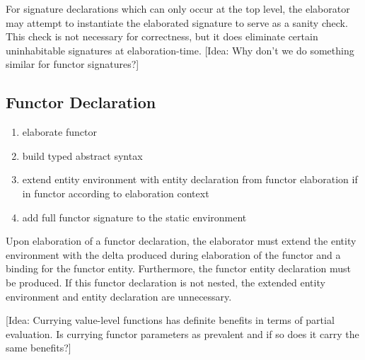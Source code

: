 For signature declarations which can only occur at the top level, the elaborator may attempt to instantiate the elaborated signature to serve as a sanity check. This check is not necessary for correctness, but it does eliminate certain uninhabitable signatures at elaboration-time. [Idea: Why don't we do something similar for functor signatures?]

\subsection{Functor Declaration}
\begin{enumerate}
\item elaborate functor 
\item build typed abstract syntax
\item extend entity environment with entity declaration from functor elaboration if in functor according to elaboration context
\item add full functor signature to the static environment
\end{enumerate}
Upon elaboration of a functor declaration, the elaborator must extend the entity environment with the delta produced during elaboration of the functor and a binding for the functor entity. Furthermore, the functor entity declaration must be produced. If this functor declaration is not nested, the extended entity environment and entity declaration are unnecessary.

[Idea: Currying value-level functions has definite benefits in terms of partial evaluation. Is currying functor parameters as prevalent and if so does it carry the same benefits?]

